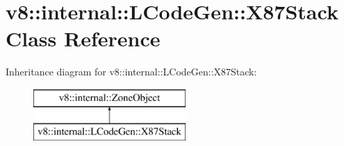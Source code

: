 \hypertarget{classv8_1_1internal_1_1_l_code_gen_1_1_x87_stack}{}\section{v8\+:\+:internal\+:\+:L\+Code\+Gen\+:\+:X87\+Stack Class Reference}
\label{classv8_1_1internal_1_1_l_code_gen_1_1_x87_stack}
Inheritance diagram for v8\+:\+:internal\+:\+:L\+Code\+Gen\+:\+:X87\+Stack\+:\begin{figure}[H]
\begin{center}
\leavevmode
\includegraphics[height=2.000000cm]{classv8_1_1internal_1_1_l_code_gen_1_1_x87_stack}
\end{center}
\end{figure}
